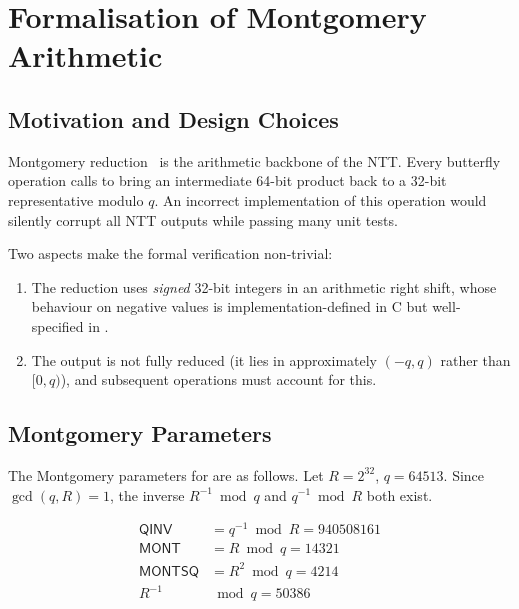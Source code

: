 
\chapter{Formalisation of Montgomery Arithmetic}
\label{ch:montgomery}

\section{Motivation and Design Choices}

Montgomery reduction~\cite{Montgomery1985} is the arithmetic backbone of the
\haetae{} NTT.  Every butterfly operation calls  to
bring an intermediate 64-bit product back to a 32-bit representative modulo
$q$.  An incorrect implementation of this operation would silently corrupt all
NTT outputs while passing many unit tests.

Two aspects make the formal verification non-trivial:
\begin{enumerate}
  \item The reduction uses \emph{signed} 32-bit integers in an arithmetic
        right shift, whose behaviour on negative values is
        implementation-defined in C but well-specified in \jasmin{}.
  \item The output is not fully reduced (it lies in approximately
        $(-q, q)$ rather than $[0, q)$), and subsequent operations must
        account for this.
\end{enumerate}

\section{Montgomery Parameters}

The Montgomery parameters for \haetae{} are as follows.
Let $R = 2^{32}$, $q = 64513$.  Since $\gcd(q, R) = 1$, the inverse $R^{-1}
\bmod q$ and $q^{-1} \bmod R$ both exist.

\begin{align}
  \mathsf{QINV} &= q^{-1} \bmod R = 940508161 \label{eq:qinv} \\
  \mathsf{MONT} &= R \bmod q = 14321 \label{eq:mont} \\
  \mathsf{MONTSQ} &= R^2 \bmod q = 4214 \label{eq:montsq} \\
  R^{-1} &\bmod q = 50386 \label{eq:rinv}
\end{align}

